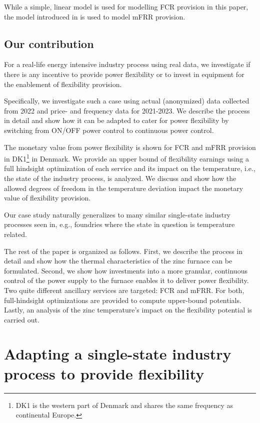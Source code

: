 \documentclass[lettersize,journal]{IEEEtran}
\begin{document}
While a simple, linear model is used for modelling FCR provision in this paper, the model introduced in \cite{gade2023load} is used to model mFRR provision.



\subsection{Our contribution}

For a real-life energy intensive industry process using real data, we investigate if there is any incentive to provide power flexibility or to invest in equipment for the enablement of flexibility provision.

Specifically, we investigate such a case using actual (anonymized) data collected from 2022 and price- and frequency data for 2021-2023. We describe the process in detail and show how it can be adapted to cater for power flexibility by switching from ON/OFF power control to continuous power control.

The monetary value from power flexibility is shown for FCR and mFRR provision in DK1\footnote{DK1 is the western part of Denmark and shares the same frequency as continental Europe.} in Denmark. We provide an upper bound of flexibility earnings using a full hindsight optimization of each service and its impact on the temperature, i.e., the state of the industry process, is analyzed. We discuss and show how the allowed degrees of freedom in the temperature deviation impact the monetary value of flexibility provision.

Our case study naturally generalizes to many similar single-state industry processes seen in, e.g., foundries where the state in question is temperature related.


The rest of the paper is organized as follows. First, we describe the process in detail and show how the thermal characteristics of the zinc furnace can be formulated. Second, we show how investments into a more granular, continuous control of the power supply to the furnace enables it to deliver power flexibility. Two quite different ancillary services are targeted: FCR and mFRR. For both, full-hindsight optimizations are provided to compute upper-bound potentials. Lastly, an analysis of the zinc temperature's impact on the flexibility potential is carried out.

\section{Adapting a single-state industry process to provide flexibility}\label{sec:zinc_furnace_description}
\end{document}
